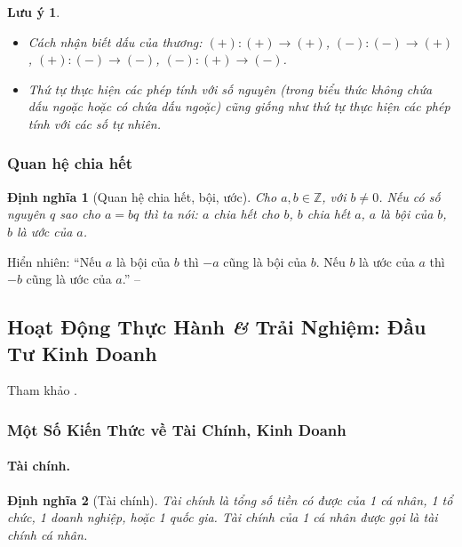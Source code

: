 \documentclass{article}
\numberwithin{equation}{section}
\newtheorem{definition}{Định nghĩa}[section]
\newtheorem{remark}{Lưu ý}[section]
\begin{document}
\begin{remark}
	\begin{itemize}
		\item Cách nhận biết dấu của thương: $(+):(+)\to(+)$, $(-):(-)\to(+)$, $(+):(-)\to(-)$, $(-):(+)\to(-)$.
		\item Thứ tự thực hiện các phép tính với số nguyên (trong biểu thức không chứa dấu ngoặc hoặc có chứa dấu ngoặc) cũng giống như thứ tự thực hiện các phép tính với các số tự nhiên.
	\end{itemize}
\end{remark}

\subsubsection{Quan hệ chia hết}

\begin{definition}[Quan hệ chia hết, bội, ước]
	Cho $a,b\in\mathbb{Z}$, với $b\ne 0$. Nếu có số nguyên $q$ sao cho $a = bq$ thì ta nói: $a$ \emph{chia hết cho} $b$, $b$ \emph{chia hết} $a$, $a$ là \emph{bội} của $b$, $b$ là \emph{ước} của $a$.
\end{definition}
Hiển nhiên: ``Nếu $a$ là bội của $b$ thì $-a$ cũng là bội của $b$. Nếu $b$ là ước của $a$ thì $-b$ cũng là ước của $a$.'' -- \cite[p. 86]{Thai_Anh_Dat_Ha_Loan_Nam_Quang_Toan_6_tap_1}

\subsection{Hoạt Động Thực Hành \textit{\&} Trải Nghiệm: Đầu Tư Kinh Doanh}
Tham khảo \cite[pp. 89--92]{Thai_Anh_Dat_Ha_Loan_Nam_Quang_Toan_6_tap_1}.

\subsubsection{Một Số Kiến Thức về Tài Chính, Kinh Doanh}

\paragraph{Tài chính.}
\begin{definition}[Tài chính]
	\emph{Tài chính} là tổng số tiền có được của 1 cá nhân, 1 tổ chức, 1 doanh nghiệp, hoặc 1 quốc gia. Tài chính của 1 cá nhân được gọi là \emph{tài chính cá nhân}.
\end{definition}
\end{document}
